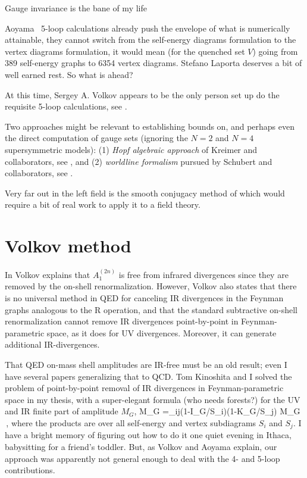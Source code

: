 \begin{bartlett}{
{Gauge invariance is the bane of my life}
        }
\end{bartlett}
\bigskip

\noindent
Aoyama \etal\ 5-loop calculations already push the envelope of what is
numerically attainable, they cannot switch from the self-energy
diagrams formulation to the vertex diagrams formulation, it would mean
(for the quenched set $V$) going from 389 self-energy graphs to 6354
vertex diagrams. Stefano Laporta deserves a bit of well earned rest. So
what is ahead?

At this time, Sergey  A. Volkov appears to be the
only person set up do the requisite 5-loop calculations,
see .

Two approaches might be relevant to
establishing bounds on, and perhaps even the direct computation
of gauge sets (ignoring the $N\!=\!2$ and $N\!=\!4$
supersymmetric models):
(1) \emph{Hopf algebraic approach} of Kreimer and collaborators,
see ,
and
(2)
\emph{worldline formalism} pursued by
{Schubert} and collaborators,
see .

Very far out in the left field is the smooth conjugacy method of
 which would require a bit of real work to apply it
to a field theory.

\section{Volkov method}
\label{sect:Volkov}

In  Volkov explains that $A_1^{(2n)}$ is free from
infrared divergences since they are removed by the on-shell
renormalization.
However, Volkov also states that there is no universal method in QED for
canceling IR divergences in the Feynman graphs analogous to the R
operation, and that the standard subtractive on-shell renormalization
cannot remove IR divergences point-by-point in Feynman-parametric space,
as it does for UV divergences. Moreover, it can generate additional
IR-divergences.

That QED on-mass shell amplitudes are IR-free must be an old result; even
I have several papers generalizing that to
QCD. Tom Kinoshita and I solved
the problem of point-by-point removal of IR divergences in
Feynman-parametric space in my thesis, with a
super-elegant formula (who needs forests?) for the UV and IR finite part
of amplitude $M_G$,
\beq
\Delta M_G =\prod_{ij}(1-I_{G/S_i})(1-K_{G/S_j}) M_G
\,,
where the products are over all self-energy and vertex subdiagrams $S_i$
and $S_j$.
I have a bright memory of figuring out how to do it one quiet evening in
Ithaca, babysitting for a friend's toddler. But, as Volkov
and Aoyama \etal{} explain, our approach was apparently
not general enough to deal with the 4- and 5-loop contributions.

